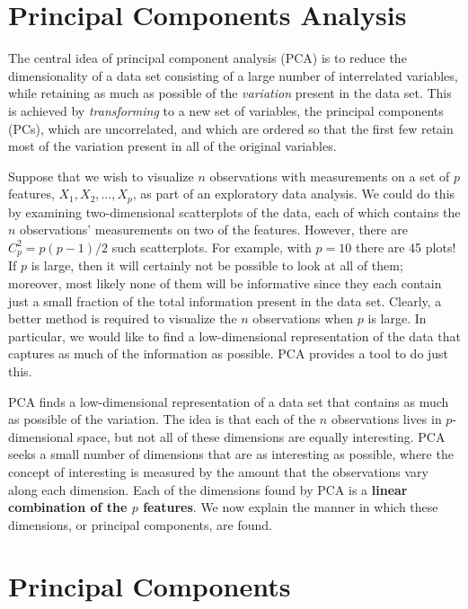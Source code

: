 \documentclass[]{book}
\begin{document}
\section{Principal Components
Analysis}\label{principal-components-analysis}

The central idea of principal component analysis (PCA) is to reduce the
dimensionality of a data set consisting of a large number of
interrelated variables, while retaining as much as possible of the
\emph{variation} present in the data set. This is achieved by
\emph{transforming} to a new set of variables, the principal components
(PCs), which are uncorrelated, and which are ordered so that the first
few retain most of the variation present in all of the original
variables.

Suppose that we wish to visualize \(n\) observations with measurements
on a set of \(p\) features, \(X_1,X_2,\ldots,X_p\), as part of an
exploratory data analysis. We could do this by examining two-dimensional
scatterplots of the data, each of which contains the \(n\) observations'
measurements on two of the features. However, there are
\(C_p^2 = p(p−1)/2\) such scatterplots. For example, with \(p =10\)
there are 45 plots! If \(p\) is large, then it will certainly not be
possible to look at all of them; moreover, most likely none of them will
be informative since they each contain just a small fraction of the
total information present in the data set. Clearly, a better method is
required to visualize the \(n\) observations when \(p\) is large. In
particular, we would like to find a low-dimensional representation of
the data that captures as much of the information as possible. PCA
provides a tool to do just this.

PCA finds a low-dimensional representation of a data set that contains
as much as possible of the variation. The idea is that each of the \(n\)
observations lives in \(p\)-dimensional space, but not all of these
dimensions are equally interesting. PCA seeks a small number of
dimensions that are as interesting as possible, where the concept of
interesting is measured by the amount that the observations vary along
each dimension. Each of the dimensions found by PCA is a \textbf{linear
combination of the \(p\) features}. We now explain the manner in which
these dimensions, or principal components, are found.

\section{Principal Components}\label{principal-components}
\end{document}
